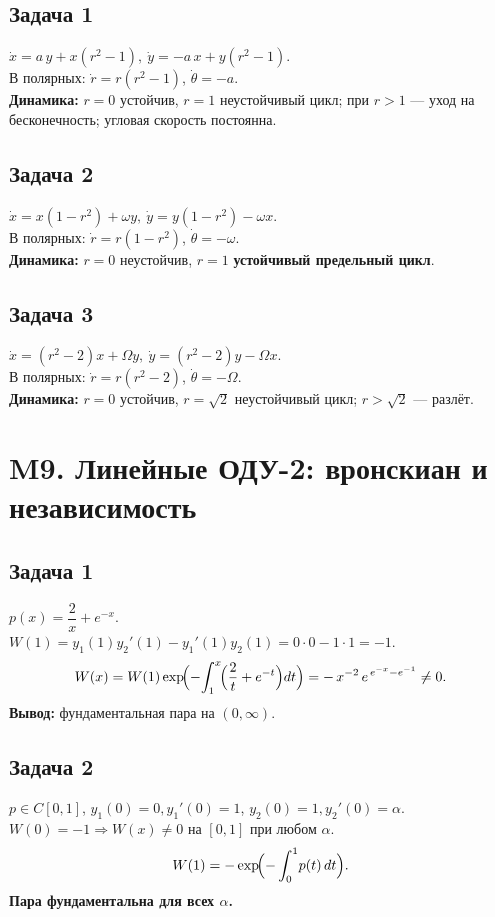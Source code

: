 \documentclass[12pt]{article}
\begin{document}
\subsection*{Задача 1}
$\dot x=a\,y+x(r^2-1),\ \dot y=-a\,x+y(r^2-1)$. \\
В полярных: $\dot r=r(r^2-1)$, $\dot\theta=-a$. \\
\textbf{Динамика: } $r=0$ устойчив, $r=1$ неустойчивый цикл; при $r>1$ — уход на бесконечность; угловая скорость постоянна.

\subsection*{Задача 2}
$\dot x=x(1-r^2)+\omega y,\ \dot y=y(1-r^2)-\omega x$. \\
В полярных: $\dot r=r(1-r^2)$, $\dot\theta=-\omega$. \\
\textbf{Динамика: } $r=0$ неустойчив, $r=1$ \textbf{устойчивый предельный цикл}.

\subsection*{Задача 3}
$\dot x=(r^2-2)x+\Omega y,\ \dot y=(r^2-2)y-\Omega x$. \\
В полярных: $\dot r=r(r^2-2)$, $\dot\theta=-\Omega$. \\
\textbf{Динамика: } $r=0$ устойчив, $r=\sqrt2$ неустойчивый цикл; $r>\sqrt2$ — разлёт.

\section*{M9. Линейные ОДУ-2: вронскиан и независимость}

\subsection*{Задача 1}
$p(x)=\dfrac{2}{x}+e^{-x}$. \\
$W(1)=y_1(1)y_2'(1)-y_1'(1)y_2(1)=0\cdot0-1\cdot1=-1$. \\
\[
W(x)=W(1)\exp\!\Bigl(-\!\int_{1}^{x}\!\Bigl(\frac{2}{t}+e^{-t}\Bigr)dt\Bigr)
=-\,x^{-2}\,e^{\,e^{-x}-e^{-1}}\neq0.
\]
\textbf{Вывод: } фундаментальная пара на $(0,\infty)$.

\subsection*{Задача 2}
$p\in C[0,1]$, $y_1(0)=0,y_1'(0)=1$, $y_2(0)=1,y_2'(0)=\alpha$. \\
$W(0)=-1\Rightarrow W(x)\neq0$ на $[0,1]$ при любом $\alpha$. \\
\[
W(1)=-\exp\!\Bigl(-\int_{0}^{1}\!p(t)\,dt\Bigr).
\]
\textbf{Пара фундаментальна для всех $\alpha$.}
\end{document}
